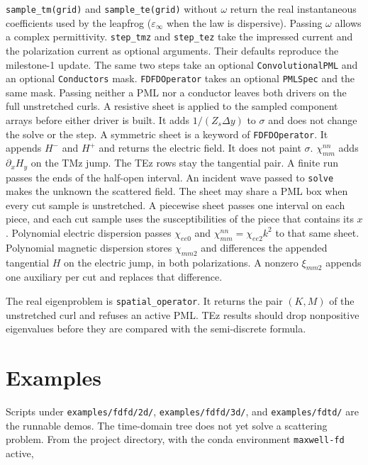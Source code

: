 \documentclass[11pt,a4paper]{article}
\begin{document}
\texttt{sample\_tm(grid)} and \texttt{sample\_te(grid)} without $\omega$
return the real instantaneous coefficients used by the leapfrog
($\varepsilon_\infty$ when the law is dispersive). Passing $\omega$ allows
a complex permittivity. \texttt{step\_tmz} and \texttt{step\_tez} take the
impressed current and the polarization current as optional arguments. Their
defaults reproduce the milestone-1 update. The same two steps take an
optional \texttt{ConvolutionalPML} and an optional \texttt{Conductors}
mask. \texttt{FDFDOperator} takes an optional \texttt{PMLSpec} and the same
mask. Passing neither a PML nor a conductor leaves both drivers on the full
unstretched curls. A resistive sheet is applied to the sampled component
arrays before either driver is built. It adds $1/(Z_s\Delta y)$ to
$\sigma$ and does not change the solve or the step. A symmetric sheet is a
keyword of \texttt{FDFDOperator}. It appends $H^-$ and $H^+$ and returns
the electric field. It does not paint $\sigma$. $\chi_{mm}^{nn}$ adds
$\partial_x H_y$ on the TMz jump. The TEz rows stay the tangential pair.
A finite run passes the
ends of the half-open interval. An incident wave passed to \texttt{solve}
makes the unknown the scattered field. The sheet may share a PML box when
every cut sample is unstretched. A piecewise sheet passes one interval
on each piece, and each cut sample uses the susceptibilities of the piece
that contains its $x$. Polynomial electric dispersion passes
$\chi_{ee0}$ and $\chi_{mm}^{nn}=\chi_{ee2}k^2$ to that same sheet.
Polynomial magnetic dispersion stores $\chi_{mm2}$ and differences the
appended tangential $H$ on the electric jump, in both polarizations.
A nonzero $\xi_{mm2}$ appends one auxiliary per cut and replaces that
difference.

The real eigenproblem is \texttt{spatial\_operator}. It returns the pair
$(K,M)$ of the unstretched curl and refuses an active PML. TEz results
should drop nonpositive eigenvalues before they are compared with the
semi-discrete formula.

\section{Examples}
\label{sec:examples}

Scripts under \texttt{examples/fdfd/2d/}, \texttt{examples/fdfd/3d/}, and
\texttt{examples/fdtd/} are the runnable demos. The time-domain tree does
not yet solve a scattering problem. From the project directory, with the
conda environment \texttt{maxwell-fd} active,
\end{document}
